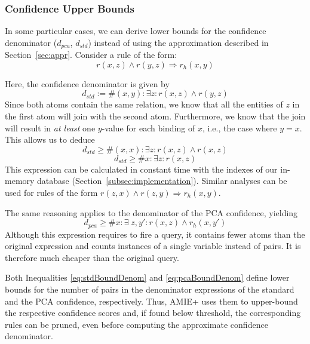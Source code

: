 \subsubsection{Confidence Upper Bounds}\label{sec:conf_upperBounds}
In some particular cases, we can derive lower bounds for the confidence denominator ($d_{pca}$, $d_{std}$) instead of using the approximation described in Section~\ref{sec:appr}.
Consider a rule of the form:
$$ r(x,z) \wedge r(y,z) \Rightarrow r_h(x,y) $$

\noindent Here, the confidence denominator is given by
$$
d_{std} := \#(x,y): \exists z: r(x,z) \wedge r(y,z)
$$
Since both atoms contain the same relation, we know that all the entities of $z$ in the first atom
will join with the second atom. Furthermore,
we know that the join will result in \emph{at least} one $y$-value for each binding of $x$, i.e., the case where $y=x$. This allows us to deduce
\[
d_{std} \ge \#(x,x): \exists z:  r(x,z) \wedge r(x,z)
\]
\begin{equation}
d_{std} \ge \#x: \exists z:  r(x,z)  \label{eq:stdBoundDenom}
\end{equation}
This expression can be calculated in constant time with the indexes of our in-memory database (Section~\ref{subsec:implementation}).
Similar analyses can be used for rules of the form $r(z,x) \wedge r(z,y) \Rightarrow r_h(x,y) $.

The same reasoning applies to the denominator of the PCA confidence, yielding
\begin{equation} \label{eq:pcaBoundDenom}
d_{pca} \ge \#x: \exists \;z, y': r(x,z) \wedge r_h(x,y')
\end{equation}
Although this expression requires to fire a query, it contains fewer atoms than the original expression and counts instances
of a single variable instead of pairs. It is therefore much cheaper than the original query.

Both Inequalities \ref{eq:stdBoundDenom} and \ref{eq:pcaBoundDenom}
define lower bounds for the number of pairs in the denominator expressions of the standard
and the PCA confidence, respectively. 
Thus, AMIE+ uses them to upper-bound the respective confidence scores and, if found below threshold, 
the corresponding rules can be pruned, even before computing the approximate confidence denominator. 







